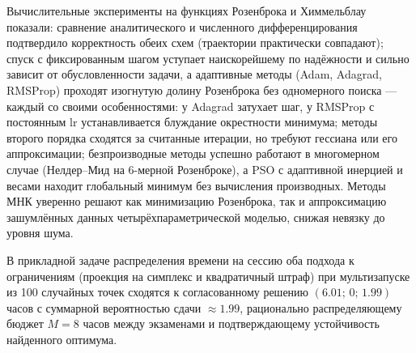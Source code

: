 \documentclass[a4paper]{article}
\begin{document}
Вычислительные эксперименты на функциях Розенброка и Химмельблау показали: сравнение аналитического и численного дифференцирования подтвердило корректность обеих схем (траектории практически совпадают); спуск с фиксированным шагом уступает наискорейшему по надёжности и сильно зависит от обусловленности задачи, а адаптивные методы (Adam, Adagrad, RMSProp) проходят изогнутую долину Розенброка без одномерного поиска — каждый со своими особенностями: у Adagrad затухает шаг, у RMSProp с постоянным $\text{lr}$ устанавливается блуждание окрестности минимума; методы второго порядка сходятся за считанные итерации, но требуют гессиана или его аппроксимации; безпроизводные методы успешно работают в многомерном случае (Нелдер–Мид на 6-мерной Розенброке), а PSO с адаптивной инерцией и весами находит глобальный минимум без вычисления производных. Методы МНК уверенно решают как минимизацию Розенброка, так и аппроксимацию зашумлённых данных четырёхпараметрической моделью, снижая невязку до уровня шума.

В прикладной задаче распределения времени на сессию оба подхода к ограничениям (проекция на симплекс и квадратичный штраф) при мультизапуске из 100 случайных точек сходятся к согласованному решению $(6.01;\, 0;\, 1.99)$ часов с суммарной вероятностью сдачи $\approx 1.99$, рационально распределяющему бюджет $M = 8$ часов между экзаменами и подтверждающему устойчивость найденного оптимума.
\end{document}

